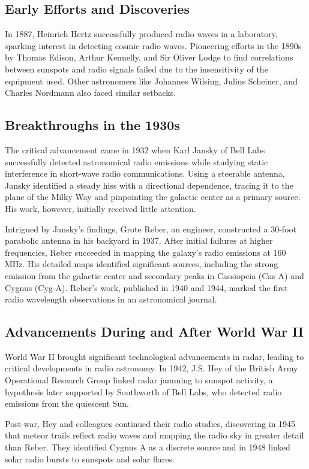 \subsection{Early Efforts and Discoveries}
In 1887, Heinrich Hertz successfully produced radio waves in a laboratory, sparking interest in detecting cosmic radio waves. Pioneering efforts in the 1890s by Thomas Edison, Arthur Kennelly, and Sir Oliver Lodge to find correlations between sunspots and radio signals failed due to the insensitivity of the equipment used. Other astronomers like Johannes Wilsing, Julius Scheiner, and Charles Nordmann also faced similar setbacks.

\subsection{Breakthroughs in the 1930s}

The critical advancement came in 1932 when Karl Jansky of Bell Labs successfully detected astronomical radio emissions while studying static interference in short-wave radio communications. Using a steerable antenna, Jansky identified a steady hiss with a directional dependence, tracing it to the plane of the Milky Way and pinpointing the galactic center as a primary source. His work, however, initially received little attention.

Intrigued by Jansky's findings, Grote Reber, an engineer, constructed a 30-foot parabolic antenna in his backyard in 1937. After initial failures at higher frequencies, Reber succeeded in mapping the galaxy's radio emissions at 160 MHz. His detailed maps identified significant sources, including the strong emission from the galactic center and secondary peaks in Cassiopeia (Cas A) and Cygnus (Cyg A). Reber's work, published in 1940 and 1944, marked the first radio wavelength observations in an astronomical journal.

\subsection{Advancements During and After World War II}

World War II brought significant technological advancements in radar, leading to critical developments in radio astronomy. In 1942, J.S. Hey of the British Army Operational Research Group linked radar jamming to sunspot activity, a hypothesis later supported by Southworth of Bell Labs, who detected radio emissions from the quiescent Sun.

Post-war, Hey and colleagues continued their radio studies, discovering in 1945 that meteor trails reflect radio waves and mapping the radio sky in greater detail than Reber. They identified Cygnus A as a discrete source and in 1948 linked solar radio bursts to sunspots and solar flares.


